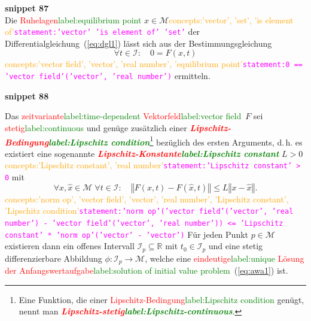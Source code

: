 \documentclass[a4paper,twoside,english,ngerman,deutsch,german,sectrefs,envcountsame,envcountchap]{svmono}
\newcommand{\setref}[2]{\textcolor{red}{#1}\textcolor{green}{#2}}
\newcommand{\snippet}[1]{\textbf{snippet #1}\\}
\newcommand{\eqnote}[2]{\textcolor{orange}{#1}\textcolor{magenta}{\texttt{#2}}}
\begin{document}
\snippet{87}
Die \setref{Ruhelagen}{label:equilibrium point} $x\in\mathcal{M}$\eqnote{concepts:'vector', 'set', 'is element of'}{statement:'vector' 'is element of' 'set'} der
Differentialgleichung~(\ref{eq:dgl1}) lässt sich aus der Bestimmungsgleichung
\[
\forall t\in\mathcal{I}:\quad0=F(x,t)
\]\eqnote{concepts:'vector field', 'vector', 'real number', 'equilibrium point'}{statement:0 == 'vector field'('vector', 'real number')}
ermitteln.

\snippet{88}
\begin{theorem}
\label{thm:Picard-Lindeloeff}Das
\setref{zeitvariante}{label:time-dependent} \setref{Vektorfeld}{label:vector field}~$F$ sei \setref{stetig}{label:continuous} und genüge zusätzlich einer\textbf{\em
\setref{Lipschitz-Bedingung}{label:Lipschitz condition}}\footnote{Eine Funktion, die einer \setref{Lipschitz-Bedingung}{label:Lipschitz condition} genügt, nennt man \textbf{\em \setref{Lipschitz-stetig}{label:Lipschitz-continuous}}.}
bezüglich des ersten Arguments, d.\,h. es existiert eine sogenannte
\textbf{\em \setref{Lipschitz-Konstante}{label:Lipschitz constant}} $L>0$\eqnote{concepts:'Lipschitz constant', 'real number'}{statement:'Lipschitz constant' > 0} mit
\begin{equation}
\forall x,\hat{x}\in\mathcal{M}\;\forall t\in\mathcal{I}:\quad\left\Vert F(x,t)-F(\hat{x},t)\right\Vert \leq L\left\Vert x-\hat{x}\right\Vert .\label{eq:Lipschitz-Bed-Satz-PL}
\end{equation}\eqnote{concepts:'norm op', 'vector field', 'vector', 'real number', 'Lipschitz constant', 'Lipschitz condition'}{statement:'norm op'('vector field'('vector', 'real number') - 'vector field'('vector', 'real number')) <= 'Lipschitz constant' * 'norm op'('vector' - 'vector')}
Für jeden Punkt $p\in\mathcal{M}$ existieren dann ein offenes Intervall
$\mathcal{I}_{p}\subseteq{\mathbb{R}}$ mit $t_{0}\in\mathcal{I}_{p}$ und eine
stetig differenzierbare Abbildung $\phi:\mathcal{I}_{p}\to\mathcal{M}$,
welche eine \setref{eindeutige}{label:unique} \setref{Lösung der Anfangswertaufgabe}{label:solution of initial value problem}~(\ref{eq:awa1})
ist.
\end{theorem}
\end{document}
